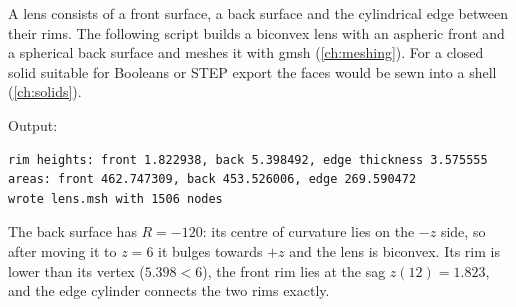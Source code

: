 A lens consists of a front surface, a back surface and the cylindrical edge between their rims.
The following script builds a biconvex lens with an aspheric front and a spherical back surface
and meshes it with gmsh (\cref{ch:meshing}). For a closed solid suitable for Booleans or STEP
export the faces would be sewn into a shell (\cref{ch:solids}).


Output:

\begin{lstlisting}[style=text]
rim heights: front 1.822938, back 5.398492, edge thickness 3.575555
areas: front 462.747309, back 453.526006, edge 269.590472
wrote lens.msh with 1506 nodes
\end{lstlisting}

The back surface has $R = -120$: its centre of curvature lies on the $-z$ side, so after moving
it to $z = 6$ it bulges towards $+z$ and the lens is biconvex. Its rim is lower than its vertex
($5.398 < 6$), the front rim lies at the sag $z(12) = 1.823$, and the edge cylinder connects the
two rims exactly.
